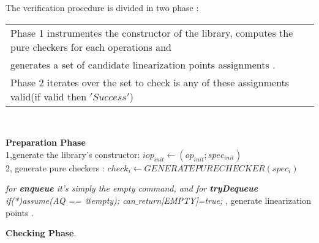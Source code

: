 \documentclass{article}
\newcommand{\Cr}{\color{red}}
\newcommand{\B}{\bfseries}
\begin{document}
The verification procedure is divided in two phase :\\
\begin{tabular}{l}\hline
Phase 1 instrumentes the constructor of the library, computes the pure checkers for each operations and\\ generates
a set of candidate linearization points assignments .\\
Phase 2 iterates over the set to check is any of these assignments valid(if valid then $'Success'$)\\
\hline
\end{tabular}\\\newline

{\B{Preparation Phase}} \\1,generate the library's constructor: $iop_{init} \leftarrow {(op_{init}; spec_{init})}$ \\
2, generate pure checkers : $check_i \leftarrow {GENERATEPURECHECKER(spec_i)}$

{\it{}\Cr for {\B{enqueue}} it's simply the empty command, and for {\B{tryDequeue}}\\

if(*){assume(AQ == @empty); can$\_$return[EMPTY]=true;}}
, generate linearization points .\\\newline

{\B{Checking Phase}}.
\end{document}
